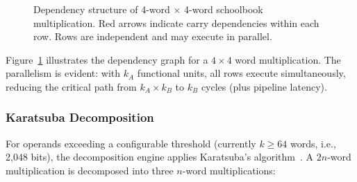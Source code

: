 \documentclass[11pt,a4paper]{article}
\begin{document}
\begin{figure}[t]
\centering
{}
\caption{Dependency structure of 4-word $\times$ 4-word schoolbook
  multiplication.  Red arrows indicate carry dependencies within each row.
  Rows are independent and may execute in parallel.}
\label{fig:mpmul-deps}
\end{figure}

Figure~\ref{fig:mpmul-deps} illustrates the dependency graph for a $4 \times 4$
word multiplication.  The parallelism is evident: with $k_A$ functional units,
all rows execute simultaneously, reducing the critical path from $k_A \times k_B$
to $k_B$ cycles (plus pipeline latency).

\subsubsection{Karatsuba Decomposition}

For operands exceeding a configurable threshold (currently $k \ge 64$ words,
i.e., 2,048 bits), the decomposition engine applies Karatsuba's
algorithm~\cite{karatsuba1962}.  A $2n$-word multiplication is decomposed into
three $n$-word multiplications:
\end{document}

